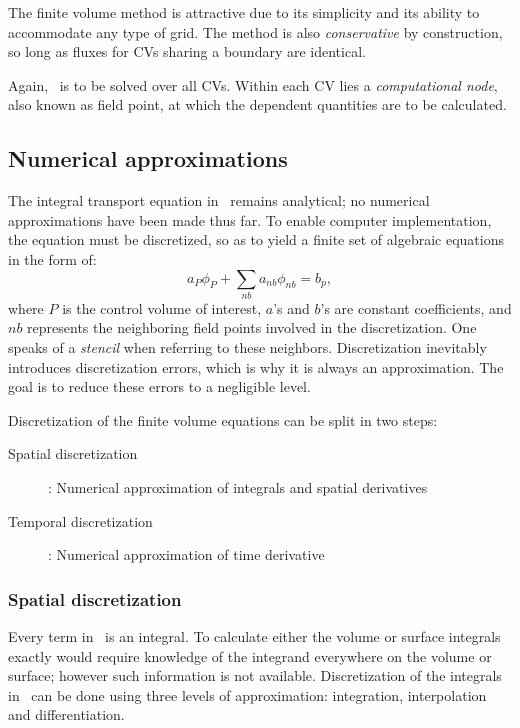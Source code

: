The finite volume method is attractive due to its simplicity and its ability to accommodate any type of grid. The method is also \textit{conservative} by construction, so long as fluxes for CVs sharing a boundary are identical.

Again,~ is to be solved over all CVs. Within each CV lies a \textit{computational node}, also known as field point, at which the dependent quantities are to be calculated.
%
%
\subsection{Numerical approximations}
\label{sec:fvnum}
%
%
The integral transport equation in~ remains analytical; no numerical approximations have been made thus far. To enable computer implementation, the equation must be discretized, so as to yield a finite set of algebraic equations in the form of:
\begin{equation*}
    a_P \phi_P + \sum_{nb}a_{nb}\phi_{nb} = b_p,
\end{equation*}
where $P$ is the control volume of interest, $a$'s and $b$'s are constant coefficients, and $nb$ represents the neighboring field points involved in the discretization. One speaks of a \textit{stencil} when referring to these neighbors. Discretization inevitably introduces discretization errors, which is why it is always an approximation. The goal is to reduce these errors to a negligible level.

Discretization of the finite volume equations can be split in two steps:
\begin{description}
    \item[Spatial discretization]: Numerical approximation of integrals and spatial derivatives
    \item[Temporal discretization]: Numerical approximation of time derivative
\end{description}

\subsubsection{Spatial discretization}
Every term in~ is an integral. To calculate either the volume or surface integrals exactly would require knowledge of the integrand everywhere on the volume or surface; however such information is not available. Discretization of the integrals in~ can be done using three levels of approximation: integration, interpolation and differentiation.

